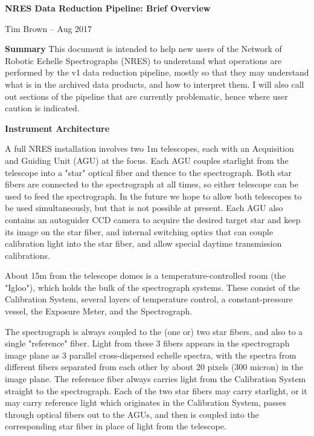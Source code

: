\null
{}

\centerline{\bf NRES Data Reduction Pipeline:  Brief Overview}
\centerline{Tim Brown --  Aug 2017}
\vskip20pt

\parindent=0pt
{\bf{Summary}}
\vskip8pt
\parindent20pt
This document is intended to help new users of the Network of Robotic Echelle
Spectrographs (NRES) to understand what operations are performed by the v1 data 
reduction pipeline, mostly so that they may understand what is in the archived 
data products, and how to interpret them.  I will also call out sections of
the pipeline that are currently problematic, hence where user caution is
indicated.

\vskip12pt
\parindent=0pt
{\bf{Instrument Architecture}}
\vskip8pt
\parindent20pt

A full NRES installation involves two 1m telescopes, each with an Acquisition
and Guiding Unit (AGU) at the focus.  Each AGU couples starlight from the 
telescope into a "star" optical fiber and thence to the spectrograph.  Both
star fibers are connected to the spectrograph at all times, so
either telescope can be used to feed the spectrograph.  In the future we hope
to allow both telescopes to be used simultaneously, but that is not possible
at present.  Each AGU also
contains an autoguider CCD camera to acquire the desired target star and 
keep its image
on the star fiber, and internal switching optics that can 
couple calibration light
into the star fiber, and allow special daytime transmission calibrations.

About 15m from the telescope domes is a temperature-controlled room (the "Igloo"), which holds the bulk of the spectrograph systems. These consist of the 
Calibration System, several layers of temperature control, a constant-pressure
vessel, the Exposure Meter, and the Spectrograph.

The spectrograph is always coupled to the (one or) two star fibers, and also
to a single "reference" fiber.  Light from these 3 fibers appears
in the spectrograph image plane as 3 parallel cross-dispersed echelle spectra,
with the spectra from different fibers separated from each other by about
20 pixels (300 micron) in the image plane.
The reference fiber always carries light from the Calibration System straight
to the spectrograph.
Each of the two star fibers may carry starlight, or it may carry reference
light which originates in the Calibration System, passes through optical
fibers out to the AGUs, and then is coupled into the corresponding
star fiber in place of light from the telescope.

